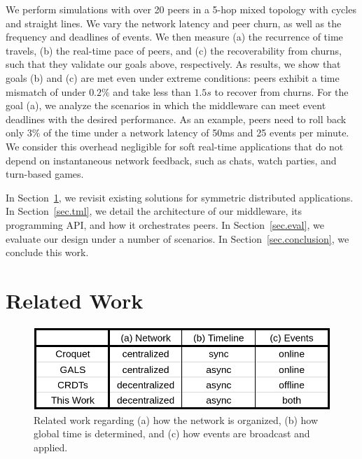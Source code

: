 \documentclass[10pt,journal,compsoc]{IEEEtran}
\begin{document}
We perform simulations with over 20 peers in a 5-hop mixed topology with cycles
and straight lines.
We vary the network latency and peer churn, as well as the frequency and
deadlines of events.
%
We then measure (a) the recurrence of time travels, (b) the real-time pace of
peers, and (c) the recoverability from churns, such that they validate our
goals above, respectively.
%
As results, we show that goals (b) and (c) are met even under extreme
conditions: peers exhibit a time mismatch of under $0.2\%$ and take less than
$1.5s$ to recover from churns.
%
For the goal (a), we analyze the scenarios in which the middleware can meet
event deadlines with the desired performance.
As an example, peers need to roll back only $3\%$ of the time under a network
latency of 50ms and 25 events per minute.
%
We consider this overhead negligible for soft real-time applications that do
not depend on instantaneous network feedback, such as chats, watch parties, and
turn-based games.

In Section~\ref{sec.related}, we revisit existing solutions for symmetric
distributed applications.
In Section~\ref{sec.tml}, we detail the architecture of our middleware, its
programming API, and how it orchestrates peers.
In Section~\ref{sec.eval}, we evaluate our design under a number of scenarios.
In Section~\ref{sec.conclusion}, we conclude this work.

\section{Related Work}
\label{sec.related}

\begin{figure}
  \centering
  \includegraphics[width=\linewidth]{table}
  \caption{
    Related work regarding
        (a) how the network is organized,
        (b) how global time is determined, and
        (c) how events are broadcast and applied.
    \label{fig.table}
  }
\end{figure}
\end{document}
